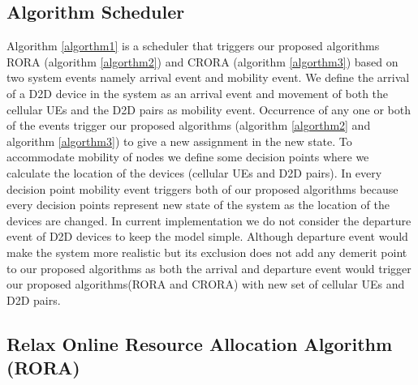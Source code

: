 \documentclass[times]{dacauth}
\begin{document}
\smallskip


\subsection{Algorithm Scheduler}
\smallskip
\noindent
Algorithm \ref{algorthm1} is a scheduler that triggers our proposed algorithms RORA (algorithm \ref{algorthm2}) and CRORA (algorithm \ref{algorthm3}) based on two system events namely arrival event and mobility event. We define the arrival of a D2D device in the system as an arrival event and movement of both the cellular UEs and the D2D pairs as mobility event. Occurrence of any one or both of the events trigger our proposed algorithms (algorithm \ref{algorthm2} and algorithm \ref{algorthm3}) to give a new assignment in the new state. To accommodate mobility of nodes we define some decision points where we calculate the location of the devices (cellular UEs and D2D pairs). In every decision point mobility event triggers both of our proposed algorithms  because every decision points represent new state of the system as the location of the devices are changed. In current implementation we do not consider the departure event of D2D devices to keep the model simple. Although departure event would make the system more realistic but its exclusion does not add any demerit point to our proposed algorithms as both the arrival and departure event would trigger our proposed algorithms(RORA and CRORA) with new set of cellular UEs and D2D pairs.


\subsection{Relax Online Resource Allocation Algorithm (RORA)}
\end{document}
